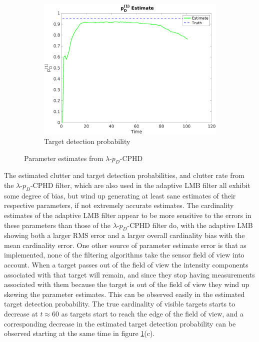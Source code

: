 \documentclass{article}
\begin{document}
\begin{figure}[H]
\begin{subfigure}[t]{0.32\textwidth}
    \centering
    \includegraphics[width=1\linewidth]{optimal/pd1_hat.png}
    \caption{Target detection probability}
  \end{subfigure}  
  \caption{Parameter estimates from $\lambda$-$p_D$-CPHD}
  \label{fig:opt_param_est}
\end{figure}
The estimated clutter and target detection probabilities, and clutter rate from the $\lambda$-$p_D$-CPHD filter, which are also used in the adaptive LMB filter all exhibit some degree of bias, but wind up generating at least sane estimates of their respective parameters, if not extremely accurate estimates. The cardinality estimates of the adaptive LMB filter appear to be more sensitive to the errors in these parameters than those of the $\lambda$-$p_D$-CPHD filter do, with the adaptive LMB showing both a larger RMS error and a larger overall cardinality bias with the mean cardinality error. One other source of parameter estimate error is that as implemented, none of the filtering algorithms take the sensor field of view into account. When a target passes out of the field of view the intensity components associated with that target will remain, and since they stop having measurements associated with them because the target is out of the field of view they wind up skewing the parameter estimates. This can be observed easily in the estimated target detection probability. The true cardinality of visible targets starts to decrease at $t \approx 60$ as targets start to reach the edge of the field of view, and a corresponding decrease in the estimated target detection probability can be observed starting at the same time in figure \ref{fig:opt_param_est}(c).
\end{document}
